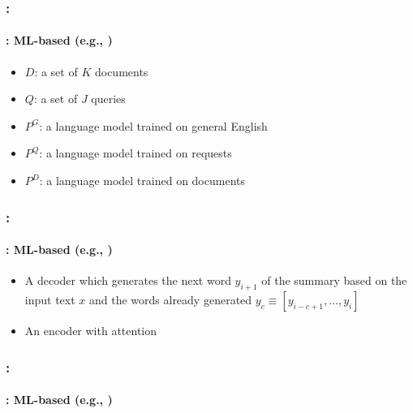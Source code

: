 \documentclass[xcolor=table]{beamer}
\begin{document}
\begin{frame}
	\frametitle{\insertshortsubtitle: \insertsection}
	\framesubtitle{\insertsubsection: ML-based (e.g., \cite{06-daumeiii-marcu})}
	
	\begin{minipage}{.6\textwidth}
		\begin{itemize}
			\item $D$: a set of $K$ documents
			\item $Q$: a set of $J$ queries
			\item $P^G$: a language model trained on general English 
			\item $P^Q$: a language model trained on requests
			\item $P^D$: a language model trained on documents
		\end{itemize}
	\end{minipage}
	\begin{minipage}{.38\textwidth}
	\end{minipage}
	
\end{frame}

\begin{frame}
	\frametitle{\insertshortsubtitle: \insertsection}
	\framesubtitle{\insertsubsection: ML-based (e.g., \cite{15-rush-al})}
	
	\begin{center}
	\end{center}
	
	\begin{itemize}
		\item[(a)] A decoder which generates the next word $y_{i+1}$ of the summary based on the input text $x$ and the words already generated $y_c \equiv [y_{i-c+1},\ldots, y_i]$
		\item[(b)] An encoder with attention
	\end{itemize}
	
\end{frame}

\begin{frame}
	\frametitle{\insertshortsubtitle: \insertsection}
	\framesubtitle{\insertsubsection: ML-based (e.g., \cite{18-narayan-al})}
	
	
\end{frame}
\end{document}
